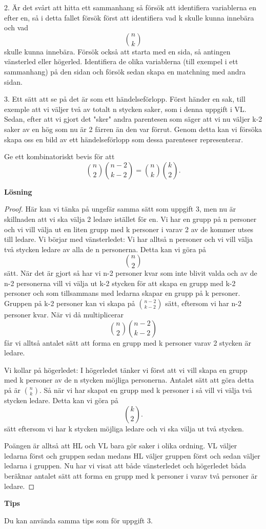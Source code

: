 \documentclass{tufte-handout}
\begin{document}
\begin{xca}
         2. Är det svårt att hitta ett sammanhang så försök att identifiera variablerna en efter en, så i detta fallet försök först att identifiera vad k skulle kunna innebära och vad $$\binom{n}{k}$$ skulle kunna innebära. Försök också att starta med en sida, så antingen vänsterled eller högerled. Identifiera de olika variablerna (till exempel i ett sammanhang) på den sidan och försök sedan skapa en matchning med andra sidan.
	 
	 3.  Ett sätt att se på det är som ett händelseförlopp. Först händer en sak, till exemple att vi väljer två av totalt n stycken saker, som i denna uppgift i VL. Sedan, efter att vi gjort det "sker" andra parentesen som säger att vi nu väljer k-2 saker av en hög som nu är 2 färren än den var förrut. Genom detta kan vi försöka skapa oss en bild av ett händelseförlopp som dessa parenteser representerar. 
\end{xca}

\begin{xca}
	Ge ett kombinatoriskt bevis för att
	$$\binom{n}{2}\binom{n-2}{k-2} = \binom{n}{k}\binom{k}{2}.$$
	
\noindent\textbf{Lösning}
\begin{proof}
Här kan vi tänka på ungefär samma sätt som uppgift 3, men nu är skillnaden att vi ska välja 2 ledare istället för en. 
Vi har en grupp på n personer och vi vill välja ut en liten grupp med k personer i varav 2 av de kommer utses till ledare. 
Vi börjar med vänsterledet: Vi har alltså n personer och vi vill välja två stycken ledare av alla de n personerna. Detta kan vi göra på $$\binom{n}{2}$$ sätt. När det är gjort så har vi n-2 personer kvar som inte blivit valda och av de n-2 personerna vill vi välja ut k-2 stycken för att skapa en grupp med k-2 personer och som tillsammans med ledarna skapar en grupp på k personer. Gruppen på k-2 personer kan vi skapa på $\binom{n-2}{k-2}$ sätt, eftersom vi har n-2 personer kvar. När vi då multiplicerar $$\binom{n}{2}\binom{n-2}{k-2}$$ får vi alltså antalet sätt att forma en grupp med k personer varav 2 stycken är ledare. 

Vi kollar på högerledet: I högerledet tänker vi först att vi vill skapa en grupp med k personer av de n stycken möjliga personerna. Antalet sätt att göra detta på är $\binom{n}{k}$. Så när vi har skapat en grupp med k personer i så vill vi välja två stycken ledare. Detta kan vi göra på $$\binom{k}{2}.$$ sätt eftersom vi har k stycken möjliga ledare och vi ska välja ut två stycken.  

Poängen är alltså att HL och VL bara gör saker i olika ordning. VL väljer ledarna först och gruppen sedan medans HL väljer gruppen först och sedan väljer ledarna i gruppen. Nu har vi visat att både vänsterledet och högerledet båda beräknar antalet sätt att forma en grupp med k personer i varav två personer är ledare. 
\end{proof}
\noindent\textbf{Tips}

	Du kan använda samma tips som för uppgift 3.

\end{xca}
\end{document}
